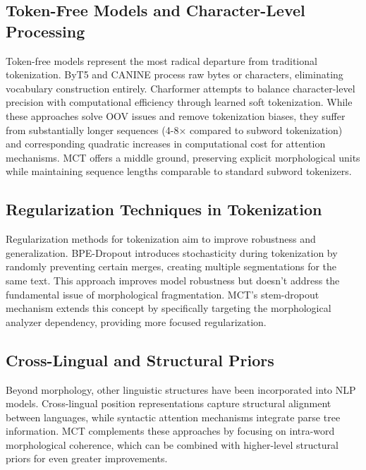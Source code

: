 \documentclass[conference]{IEEEtran}
\begin{document}
\subsection{Token-Free Models and Character-Level Processing}
Token-free models represent the most radical departure from traditional tokenization. ByT5 \cite{xue2022byt5} and CANINE \cite{clark2021canine} process raw bytes or characters, eliminating vocabulary construction entirely. Charformer \cite{tay2022charformer} attempts to balance character-level precision with computational efficiency through learned soft tokenization. While these approaches solve OOV issues and remove tokenization biases, they suffer from substantially longer sequences (4-8× compared to subword tokenization) and corresponding quadratic increases in computational cost for attention mechanisms. MCT offers a middle ground, preserving explicit morphological units while maintaining sequence lengths comparable to standard subword tokenizers.

\subsection{Regularization Techniques in Tokenization}
Regularization methods for tokenization aim to improve robustness and generalization. BPE-Dropout \cite{provilkov2020bpe} introduces stochasticity during tokenization by randomly preventing certain merges, creating multiple segmentations for the same text. This approach improves model robustness but doesn't address the fundamental issue of morphological fragmentation. MCT's stem-dropout mechanism extends this concept by specifically targeting the morphological analyzer dependency, providing more focused regularization.

\subsection{Cross-Lingual and Structural Priors}
Beyond morphology, other linguistic structures have been incorporated into NLP models. Cross-lingual position representations \cite{ding2020cross} capture structural alignment between languages, while syntactic attention mechanisms \cite{strubell2018linguistically} integrate parse tree information. MCT complements these approaches by focusing on intra-word morphological coherence, which can be combined with higher-level structural priors for even greater improvements.
\end{document}
